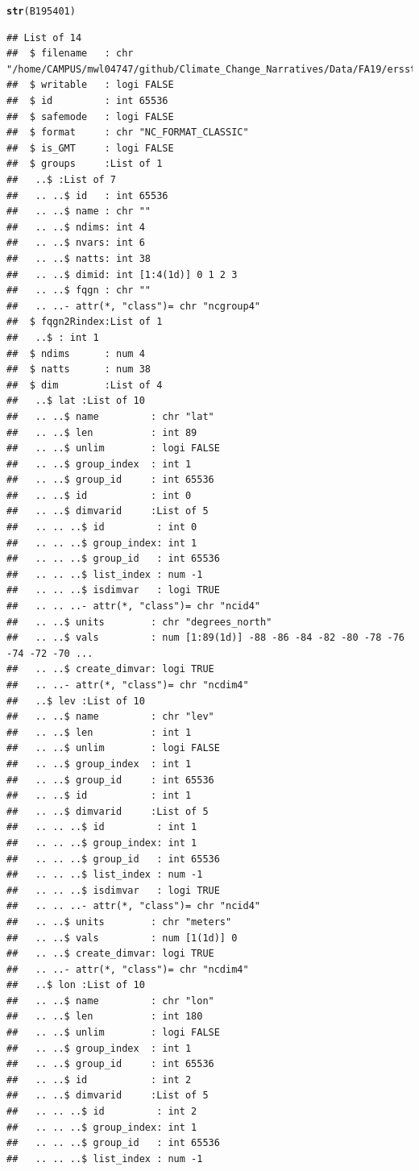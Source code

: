 \documentclass{article}\usepackage[]{graphicx}\usepackage[]{color}
\makeatletter
\newcommand{\hlstd}[1]{\textcolor[rgb]{0.345,0.345,0.345}{#1}}%
\newcommand{\hlkwd}[1]{\textcolor[rgb]{0.737,0.353,0.396}{\textbf{#1}}}%
\newenvironment{kframe}{%
 \def\at@end@of@kframe{}%
 \ifinner\ifhmode%
  \def\at@end@of@kframe{\end{minipage}}%
  \begin{minipage}{\columnwidth}%
 \fi\fi%
 \def\FrameCommand##1{\hskip\@totalleftmargin \hskip-\fboxsep
 \colorbox{shadecolor}{##1}\hskip-\fboxsep
     \hskip-\linewidth \hskip-\@totalleftmargin \hskip\columnwidth}%
 \MakeFramed {\advance\hsize-\width
   \@totalleftmargin\z@ \linewidth\hsize
   \@setminipage}}%
 {\par\unskip\endMakeFramed%
 \at@end@of@kframe}
\newenvironment{knitrout}{}{} %
\makeatother
\begin{document}
\begin{knitrout}
\begin{kframe}
\begin{alltt}
\hlkwd{str}\hlstd{(B195401)}
\end{alltt}
\begin{verbatim}
## List of 14
##  $ filename   : chr "/home/CAMPUS/mwl04747/github/Climate_Change_Narratives/Data/FA19/ersst.v5.185401.nc"
##  $ writable   : logi FALSE
##  $ id         : int 65536
##  $ safemode   : logi FALSE
##  $ format     : chr "NC_FORMAT_CLASSIC"
##  $ is_GMT     : logi FALSE
##  $ groups     :List of 1
##   ..$ :List of 7
##   .. ..$ id   : int 65536
##   .. ..$ name : chr ""
##   .. ..$ ndims: int 4
##   .. ..$ nvars: int 6
##   .. ..$ natts: int 38
##   .. ..$ dimid: int [1:4(1d)] 0 1 2 3
##   .. ..$ fqgn : chr ""
##   .. ..- attr(*, "class")= chr "ncgroup4"
##  $ fqgn2Rindex:List of 1
##   ..$ : int 1
##  $ ndims      : num 4
##  $ natts      : num 38
##  $ dim        :List of 4
##   ..$ lat :List of 10
##   .. ..$ name         : chr "lat"
##   .. ..$ len          : int 89
##   .. ..$ unlim        : logi FALSE
##   .. ..$ group_index  : int 1
##   .. ..$ group_id     : int 65536
##   .. ..$ id           : int 0
##   .. ..$ dimvarid     :List of 5
##   .. .. ..$ id         : int 0
##   .. .. ..$ group_index: int 1
##   .. .. ..$ group_id   : int 65536
##   .. .. ..$ list_index : num -1
##   .. .. ..$ isdimvar   : logi TRUE
##   .. .. ..- attr(*, "class")= chr "ncid4"
##   .. ..$ units        : chr "degrees_north"
##   .. ..$ vals         : num [1:89(1d)] -88 -86 -84 -82 -80 -78 -76 -74 -72 -70 ...
##   .. ..$ create_dimvar: logi TRUE
##   .. ..- attr(*, "class")= chr "ncdim4"
##   ..$ lev :List of 10
##   .. ..$ name         : chr "lev"
##   .. ..$ len          : int 1
##   .. ..$ unlim        : logi FALSE
##   .. ..$ group_index  : int 1
##   .. ..$ group_id     : int 65536
##   .. ..$ id           : int 1
##   .. ..$ dimvarid     :List of 5
##   .. .. ..$ id         : int 1
##   .. .. ..$ group_index: int 1
##   .. .. ..$ group_id   : int 65536
##   .. .. ..$ list_index : num -1
##   .. .. ..$ isdimvar   : logi TRUE
##   .. .. ..- attr(*, "class")= chr "ncid4"
##   .. ..$ units        : chr "meters"
##   .. ..$ vals         : num [1(1d)] 0
##   .. ..$ create_dimvar: logi TRUE
##   .. ..- attr(*, "class")= chr "ncdim4"
##   ..$ lon :List of 10
##   .. ..$ name         : chr "lon"
##   .. ..$ len          : int 180
##   .. ..$ unlim        : logi FALSE
##   .. ..$ group_index  : int 1
##   .. ..$ group_id     : int 65536
##   .. ..$ id           : int 2
##   .. ..$ dimvarid     :List of 5
##   .. .. ..$ id         : int 2
##   .. .. ..$ group_index: int 1
##   .. .. ..$ group_id   : int 65536
##   .. .. ..$ list_index : num -1

\end{verbatim}
\end{kframe}
\end{knitrout}
\end{document}
